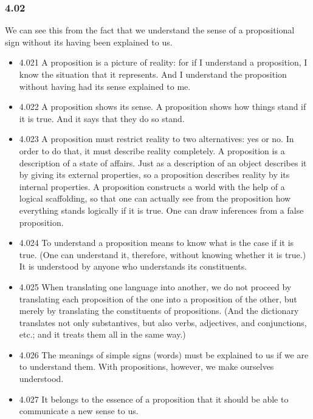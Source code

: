 \documentclass[11pt]{article}
\begin{document}
\subsubsection*{4.02}
\label{sec:orga308db4}
We can see this from the fact that we understand the sense of a
propositional sign without its having been explained to us.
\begin{itemize}
\item 4.021
\label{sec:orgbef4fd1}
A proposition is a picture of reality: for if I understand a
proposition, I know the situation that it represents. And I understand the
proposition without having had its sense explained to me.
\item 4.022
\label{sec:org895f6ea}
A proposition shows its sense. A proposition shows how things stand
if it is true. And it says that they do so stand.
\item 4.023
\label{sec:org9967506}
A proposition must restrict reality to two alternatives: yes or no.
In order to do that, it must describe reality completely. A proposition is
a description of a state of affairs. Just as a description of an object
describes it by giving its external properties, so a proposition describes
reality by its internal properties. A proposition constructs a world with
the help of a logical scaffolding, so that one can actually see from the
proposition how everything stands logically if it is true. One can draw
inferences from a false proposition.
\item 4.024
\label{sec:org91e7d42}
To understand a proposition means to know what is the case if it is
true. (One can understand it, therefore, without knowing whether it is
true.) It is understood by anyone who understands its constituents.
\item 4.025
\label{sec:org7ffad81}
When translating one language into another, we do not proceed by
translating each proposition of the one into a proposition of the other,
but merely by translating the constituents of propositions. (And the
dictionary translates not only substantives, but also verbs, adjectives,
and conjunctions, etc.; and it treats them all in the same way.)
\item 4.026
\label{sec:org81b9346}
The meanings of simple signs (words) must be explained to us if we
are to understand them. With propositions, however, we make ourselves
understood.
\item 4.027
\label{sec:orgde833f0}
It belongs to the essence of a proposition that it should be able to
communicate a new sense to us.
\end{itemize}
\end{document}
